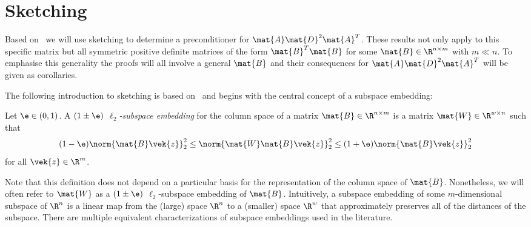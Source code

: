 \chapter{Sketching}\label{chap:sketching}



Based on~\cite{Avron-FasterRandomizedInfeasibleIPMs} we will use sketching to determine a preconditioner for \(\mat{A} \mat{D}^2 \mat{A}^T\).
These results not only apply to this specific matrix but all symmetric positive definite matrices of the form \(\mat{B}^T \mat{B}\) for some \(\mat{B} \in \R^{n \times m}\) with \(m \ll n\).
To emphasise this generality the proofs will all involve a general \(\mat{B}\) and their consequences for \(\mat{A}\mat{D}^2\mat{A}^T\) will be given as corollaries.

The following introduction to sketching is based on~\cite{Woodruff-Sketching} and begins with the central concept of a subspace embedding:
\begin{definition}\label{def:subspace-embedding}
Let \(\e \in (0, 1)\). A \emph{\((1 \pm \e)\) \(\ell_2\)-subspace embedding} for the column space of a matrix \(\mat{B} \in \R^{n \times m}\) is a matrix \(\mat{W} \in \R^{w \times n}\) such that
\[ (1-\e) \norm{\mat{B}\vek{z}}_2^2 \leq \norm{\mat{W}\mat{B}\vek{z}}_2^2 \leq (1+\e)\norm{\mat{B}\vek{z}}_2^2 \]
for all \(\vek{z} \in \R^m\).
\end{definition}
Note that this definition does not depend on a particular basis for the representation of the column space of \(\mat{B}\).
Nonetheless, we will often refer to \(\mat{W}\) as a \((1\pm\e)\) \(\ell_2\)-subspace embedding of \(\mat{B}\).
Intuitively, a subspace embedding of some \(m\)-dimensional subspace of \(\R^n\) is a linear map from the (large) space \(\R^n\) to a (smaller) space \(\R^w\) that approximately preserves all of the distances of the subspace.
There are multiple equivalent characterizations of subspace embeddings used in the literature.

